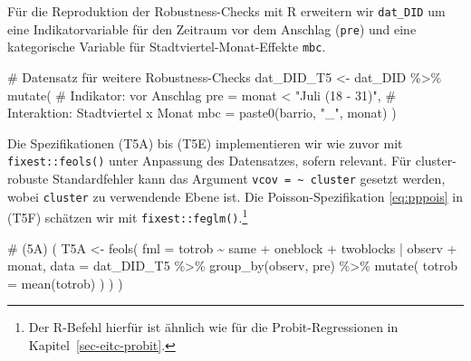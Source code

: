 \documentclass[
  a4paper,
  DIV=11,
  oneside]{scrreprt}
\newenvironment{Shaded}{\begin{snugshade}}{\end{snugshade}}
\newcommand{\AttributeTok}[1]{\textcolor[rgb]{0.40,0.45,0.13}{#1}}
\newcommand{\CommentTok}[1]{\textcolor[rgb]{0.37,0.37,0.37}{#1}}
\newcommand{\FunctionTok}[1]{\textcolor[rgb]{0.28,0.35,0.67}{#1}}
\newcommand{\NormalTok}[1]{\textcolor[rgb]{0.00,0.23,0.31}{#1}}
\newcommand{\OtherTok}[1]{\textcolor[rgb]{0.00,0.23,0.31}{#1}}
\newcommand{\SpecialCharTok}[1]{\textcolor[rgb]{0.37,0.37,0.37}{#1}}
\newcommand{\StringTok}[1]{\textcolor[rgb]{0.13,0.47,0.30}{#1}}
\begin{document}
Für die Reproduktion der Robustness-Checks mit R erweitern wir
\texttt{dat\_DID} um eine Indikatorvariable für den Zeitraum vor dem
Anschlag (\texttt{pre}) und eine kategorische Variable für
Stadtviertel-Monat-Effekte \texttt{mbc}.

\begin{Shaded}
\begin{Highlighting}[]
\CommentTok{\# Datensatz für weitere Robustness{-}Checks}
\NormalTok{dat\_DID\_T5 }\OtherTok{\textless{}{-}}\NormalTok{ dat\_DID }\SpecialCharTok{\%\textgreater{}\%}
  \FunctionTok{mutate}\NormalTok{(}
    \CommentTok{\# Indikator: vor Anschlag}
    \AttributeTok{pre =}\NormalTok{ monat }\SpecialCharTok{\textless{}} \StringTok{"Juli (18 {-} 31)"}\NormalTok{,}
    \CommentTok{\# Interaktion: Stadtviertel x Monat}
    \AttributeTok{mbc =} \FunctionTok{paste0}\NormalTok{(barrio, }\StringTok{"\_"}\NormalTok{, monat)}
\NormalTok{  )}
\end{Highlighting}
\end{Shaded}

Die Spezifikationen (T5A) bis (T5E) implementieren wir wie zuvor mit
\texttt{fixest::feols()} unter Anpassung des Datensatzes, sofern
relevant. Für cluster-robuste Standardfehler kann das Argument
\texttt{vcov\ =\ \textasciitilde{}\ cluster} gesetzt werden, wobei
\texttt{cluster} zu verwendende Ebene ist. Die Poisson-Spezifikation
\eqref{eq:pppois} in (T5F) schätzen wir mit
\texttt{fixest::feglm()}.\footnote{Der R-Befehl hierfür ist ähnlich wie
  für die Probit-Regressionen in Kapitel~\ref{sec-eitc-probit}.}

\begin{Shaded}
\begin{Highlighting}[]
\CommentTok{\# (5A)}
\NormalTok{(}
\NormalTok{  T5A }\OtherTok{\textless{}{-}} \FunctionTok{feols}\NormalTok{(}
    \AttributeTok{fml =}\NormalTok{ totrob }\SpecialCharTok{\textasciitilde{}} 
\NormalTok{      same}
    \SpecialCharTok{+}\NormalTok{ oneblock}
    \SpecialCharTok{+}\NormalTok{ twoblocks}
    \SpecialCharTok{|}\NormalTok{ observ }\SpecialCharTok{+}\NormalTok{ monat,}
    \AttributeTok{data =}\NormalTok{ dat\_DID\_T5 }\SpecialCharTok{\%\textgreater{}\%}
      \FunctionTok{group\_by}\NormalTok{(observ, pre) }\SpecialCharTok{\%\textgreater{}\%}
      \FunctionTok{mutate}\NormalTok{(}
        \AttributeTok{totrob =} \FunctionTok{mean}\NormalTok{(totrob)}
\NormalTok{      )}
\NormalTok{  )}
\NormalTok{)}
\end{Highlighting}
\end{Shaded}
\end{document}
